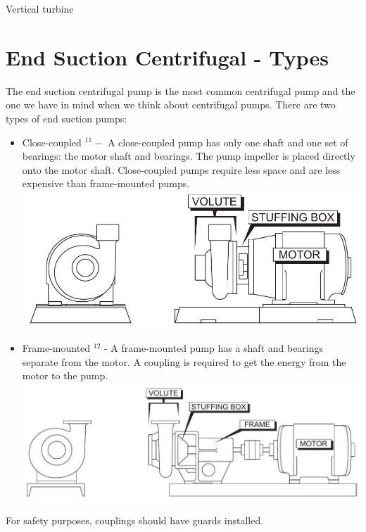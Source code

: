\documentclass[10pt]{article}
\begin{document}
Vertical turbine

\section{End Suction Centrifugal - Types}
The end suction centrifugal pump is the most common centrifugal pump and the one we have in mind when we think about centrifugal pumps. There are two types of end suction pumps:

\begin{itemize}
  \item Close-coupled ${ }^{11}-$ A close-coupled pump has only one shaft and one set of bearings: the motor shaft and bearings. The pump impeller is placed directly onto the motor shaft. Close-coupled pumps require less space and are less expensive than frame-mounted pumps.\\

\includegraphics[max width=\textwidth]{CentrifugalEndSuctionCloseCoupled}

  \item Frame-mounted ${ }^{12}$ - A frame-mounted pump has a shaft and bearings separate from the motor. A coupling is required to get the energy from the motor to the pump.\\

\includegraphics[max width=\textwidth]{CentrifugalEndSuctionFrameMounted}

\end{itemize}
For safety purposes, couplings should have guards installed.
\end{document}

